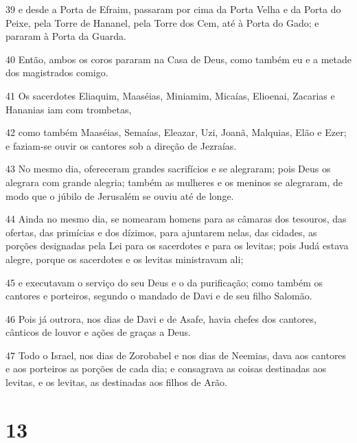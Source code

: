 \par 39 e desde a Porta de Efraim, passaram por cima da Porta Velha e da Porta do Peixe, pela Torre de Hananel, pela Torre dos Cem, até à Porta do Gado; e pararam à Porta da Guarda.
\par 40 Então, ambos os coros pararam na Casa de Deus, como também eu e a metade dos magistrados comigo.
\par 41 Os sacerdotes Eliaquim, Maaséias, Miniamim, Micaías, Elioenai, Zacarias e Hananias iam com trombetas,
\par 42 como também Maaséias, Semaías, Eleazar, Uzi, Joanã, Malquias, Elão e Ezer; e faziam-se ouvir os cantores sob a direção de Jezraías.
\par 43 No mesmo dia, ofereceram grandes sacrifícios e se alegraram; pois Deus os alegrara com grande alegria; também as mulheres e os meninos se alegraram, de modo que o júbilo de Jerusalém se ouviu até de longe.
\par 44 Ainda no mesmo dia, se nomearam homens para as câmaras dos tesouros, das ofertas, das primícias e dos dízimos, para ajuntarem nelas, das cidades, as porções designadas pela Lei para os sacerdotes e para os levitas; pois Judá estava alegre, porque os sacerdotes e os levitas ministravam ali;
\par 45 e executavam o serviço do seu Deus e o da purificação; como também os cantores e porteiros, segundo o mandado de Davi e de seu filho Salomão.
\par 46 Pois já outrora, nos dias de Davi e de Asafe, havia chefes dos cantores, cânticos de louvor e ações de graças a Deus.
\par 47 Todo o Israel, nos dias de Zorobabel e nos dias de Neemias, dava aos cantores e aos porteiros as porções de cada dia; e consagrava as coisas destinadas aos levitas, e os levitas, as destinadas aos filhos de Arão.

\chapter{13}

